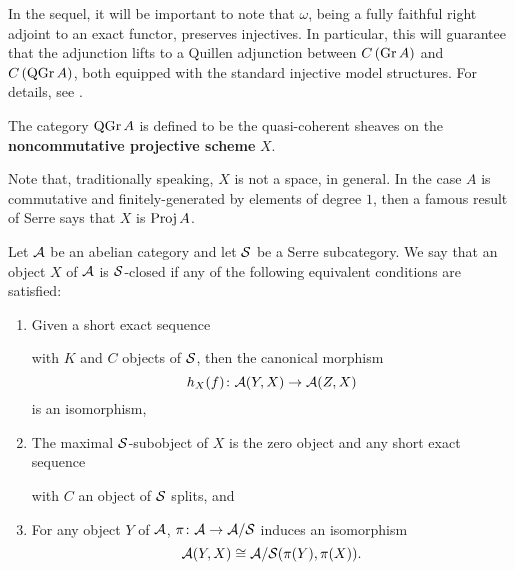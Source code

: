 \begin{remark}
  In the sequel, it will be important to note that \(\omega\), being a fully faithful right adjoint to an exact functor, preserves injectives.
  In particular, this will guarantee that the adjunction lifts to a Quillen adjunction between \(C\left(\operatorname{Gr}A\right)\) and \(C\left(\operatorname{QGr}A\right)\), both equipped with the standard injective model structures.  For details, see \parencite{Hovey01}.
\end{remark}

The category \(\operatorname{QGr}A\) is defined to be the quasi-coherent sheaves on the \textbf{noncommutative projective scheme} \(X\). 

\begin{remark}
  Note that, traditionally speaking, \(X\) is not a space, in general. In the case \(A\) is commutative and finitely-generated by elements of degree \(1\), then a famous result of Serre says that \(X\) is \(\operatorname{Proj} A\).
\end{remark}

\begin{definition}\label{defn: serre closed}
  Let \(\mathcal{A}\) be an abelian category and let \(\mathcal{S}\) be a Serre subcategory.
  We say that an object \(X\) of \(\mathcal{A}\) is \(\mathcal{S}\)-closed if any of the following equivalent conditions are satisfied:
  \begin{enumerate}
  \item\label{defn:serre closed 1}
    Given a short exact sequence 
    \begin{center}
    \end{center}
    with $K$ and $C$ objects of $\mathcal{S}$, then the canonical morphism
    $$h_X(f) \colon \mathcal{A}(Y,X) \to \mathcal{A}(Z,X)$$
    is an isomorphism,
  \item\label{defn:serre closed 2}
    The maximal \(\mathcal{S}\)-subobject of $X$ is the zero object and any short exact sequence 
    \begin{center}
    \end{center}
    with $C$ an object of $\mathcal{S}$ splits, and
  \item\label{defn: serre closed 3}
    For any object $Y$ of $\mathcal{A}$, $\pi \colon \mathcal{A} \rightarrow \mathcal{A}/\mathcal{S}$ induces an isomorphism
    $$\mathcal{A}(Y, X) \cong \mathcal{A}/\mathcal{S}(\pi(Y), \pi(X)).$$
  \end{enumerate}
\end{definition}

